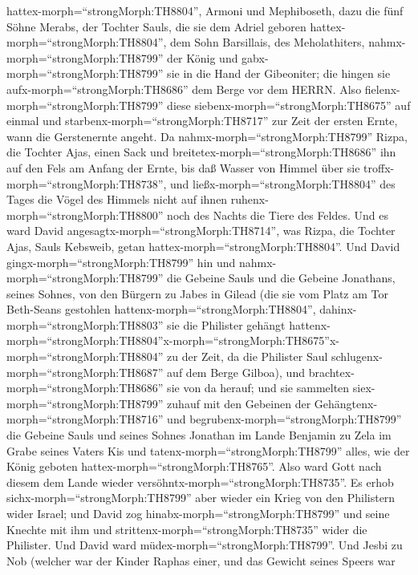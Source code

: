 hattex-morph=``strongMorph:TH8804'', Armoni und Mephiboseth, dazu die
fünf Söhne Merabs, der Tochter Sauls, die sie dem Adriel geboren
hattex-morph=``strongMorph:TH8804'', dem Sohn Barsillais, des
Meholathiters, nahmx-morph=``strongMorph:TH8799'' der König 
und gabx-morph=``strongMorph:TH8799'' sie in die Hand der Gibeoniter;
die hingen sie aufx-morph=``strongMorph:TH8686'' dem Berge vor dem
HERRN. Also fielenx-morph=``strongMorph:TH8799'' diese
siebenx-morph=``strongMorph:TH8675'' auf einmal und
starbenx-morph=``strongMorph:TH8717'' zur Zeit der ersten Ernte, wann
die Gerstenernte angeht.  Da
nahmx-morph=``strongMorph:TH8799'' Rizpa, die Tochter Ajas, einen Sack
und breitetex-morph=``strongMorph:TH8686'' ihn auf den Fels am Anfang
der Ernte, bis daß Wasser von Himmel über sie
troffx-morph=``strongMorph:TH8738'', und
ließx-morph=``strongMorph:TH8804'' des Tages die Vögel des Himmels nicht
auf ihnen ruhenx-morph=``strongMorph:TH8800'' noch des Nachts die Tiere
des Feldes.  Und es ward David
angesagtx-morph=``strongMorph:TH8714'', was Rizpa, die Tochter Ajas,
Sauls Kebsweib, getan hattex-morph=``strongMorph:TH8804''. 
Und David gingx-morph=``strongMorph:TH8799'' hin und
nahmx-morph=``strongMorph:TH8799'' die Gebeine Sauls und die Gebeine
Jonathans, seines Sohnes, von den Bürgern zu Jabes in Gilead (die sie
vom Platz am Tor Beth-Seans gestohlen
hattenx-morph=``strongMorph:TH8804'',
dahinx-morph=``strongMorph:TH8803'' sie die Philister gehängt
hattenx-morph=``strongMorph:TH8804''\textbar x-morph=``strongMorph:TH8675''x-morph=``strongMorph:TH8804''
zu der Zeit, da die Philister Saul
schlugenx-morph=``strongMorph:TH8687'' auf dem Berge Gilboa),
 und brachtex-morph=``strongMorph:TH8686'' sie von da
herauf; und sie sammelten siex-morph=``strongMorph:TH8799'' zuhauf mit
den Gebeinen der Gehängtenx-morph=``strongMorph:TH8716'' 
und begrubenx-morph=``strongMorph:TH8799'' die Gebeine Sauls und seines
Sohnes Jonathan im Lande Benjamin zu Zela im Grabe seines Vaters Kis und
tatenx-morph=``strongMorph:TH8799'' alles, wie der König geboten
hattex-morph=``strongMorph:TH8765''. Also ward Gott nach diesem dem
Lande wieder versöhntx-morph=``strongMorph:TH8735''.  Es
erhob sichx-morph=``strongMorph:TH8799'' aber wieder ein Krieg von den
Philistern wider Israel; und David zog
hinabx-morph=``strongMorph:TH8799'' und seine Knechte mit ihm und
strittenx-morph=``strongMorph:TH8735'' wider die Philister. Und David
ward müdex-morph=``strongMorph:TH8799''.  Und Jesbi zu Nob
(welcher war der Kinder Raphas einer, und das Gewicht seines Speers war
